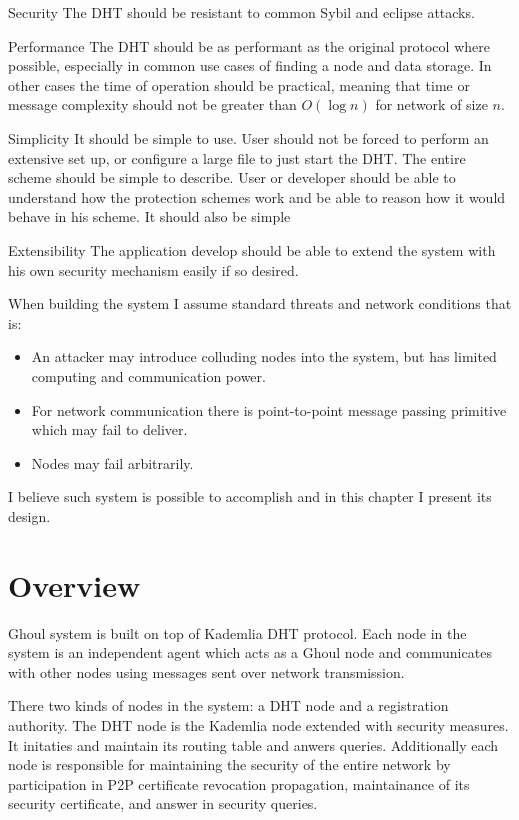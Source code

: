 \begin{description}
  \item{Security} The DHT should be resistant to common Sybil and eclipse
    attacks.
  \item{Performance} The DHT should be as performant as the original protocol
    where possible, especially in common use cases of finding a node and data
    storage. In other cases the time of operation should be practical, meaning
    that time or message complexity should not be greater than $O(\log n)$ for
    network of size $n$.
  \item{Simplicity} It should be simple to use. User should not be forced to
    perform an extensive set up, or configure a large file to just start the
    DHT.  The entire scheme should be simple to describe. User or developer
    should be able to understand how the protection schemes work and be able to
    reason how it would behave in his scheme. It should also be simple
  \item{Extensibility} The application develop should be able to extend the
    system with his own security mechanism easily if so desired.
\end{description}

When building the system I assume standard threats and network conditions that
is:

\begin{itemize}
  \item An attacker may introduce colluding nodes into the system, but has
    limited computing and communication power.
  \item For network communication there is point-to-point message passing
    primitive which may fail to deliver.
  \item Nodes may fail arbitrarily.
\end{itemize}

I believe such system is possible to accomplish and in this chapter I present
its design.

\section{Overview}
Ghoul system is built on top of Kademlia DHT protocol. Each node in the system
is an independent agent which acts as a Ghoul node and communicates with other
nodes using messages sent over network transmission.

There two kinds of nodes in the system: a DHT node and a registration authority.
The DHT node is the Kademlia node extended with security measures. It initaties
and maintain its routing table and anwers queries. Additionally each node is
responsible for maintaining the security of the entire network by participation
in P2P certificate revocation propagation, maintainance of its security
certificate, and answer in security queries.

